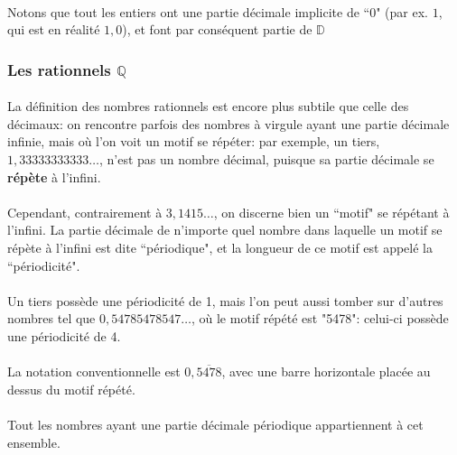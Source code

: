 \documentclass[a4paper]{book}
\begin{document}
    \paragraph{}
    Notons que tout les entiers ont une partie décimale implicite de ``0" (par ex. $1$, qui est en réalité $1,0$), et font par conséquent partie de $\mathds{D}$
    
    \subsubsection{Les rationnels $\mathds{Q}$}
    \paragraph{}
    La définition des nombres rationnels est encore plus subtile que celle des décimaux: on rencontre parfois des nombres à virgule ayant une partie décimale infinie, mais où l'on voit un motif se répéter: par exemple, un tiers, $1,33333333333\dots$, n'est pas un nombre décimal, puisque sa partie décimale se \textbf{répète} à l'infini. \\
    \paragraph{}
    Cependant, contrairement à $3,1415\dots$, on discerne bien un ``motif" se répétant à l'infini. La partie décimale de n'importe quel nombre dans laquelle un motif se répète à l'infini est dite ``périodique", et la longueur de ce motif est appelé la ``périodicité".\\
    \paragraph{}
    Un tiers possède une périodicité de 1, mais l'on peut aussi tomber sur d'autres nombres tel que $0,54785478547\dots$, où le motif répété est "5478": celui-ci possède une périodicité de 4. \\
    \paragraph{}
    La notation conventionnelle est $0,\overline{5478}$, avec une barre horizontale placée au dessus du motif répété.
    \paragraph{}
    Tout les nombres ayant une partie décimale périodique appartiennent à cet ensemble. 
    
\end{document}
